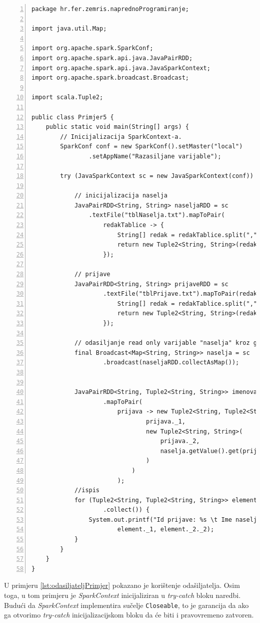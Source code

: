 \documentclass[times, utf8, zavrsni, numeric]{fer}
\begin{document}
\vspace{5mm}
\begin{lstlisting}[numbers=left, label={lst:odasiljateljPrimjer}, caption={Korištenje odašiljatelja.}, escapechar=|]
package hr.fer.zemris.naprednoProgramiranje;

import java.util.Map;

import org.apache.spark.SparkConf;
import org.apache.spark.api.java.JavaPairRDD;
import org.apache.spark.api.java.JavaSparkContext;
import org.apache.spark.broadcast.Broadcast;

import scala.Tuple2;

public class Primjer5 {
	public static void main(String[] args) {
		// Inicijalizacija SparkContext-a.
		SparkConf conf = new SparkConf().setMaster("local")
				.setAppName("Razasiljane varijable");
				
		try (JavaSparkContext sc = new JavaSparkContext(conf)) {
		
			// inicijalizacija naselja
			JavaPairRDD<String, String> naseljaRDD = sc
				.textFile("tblNaselja.txt").mapToPair(
					redakTablice -> {
						String[] redak = redakTablice.split(",");
						return new Tuple2<String, String>(redak[0], redak[1]);
					});
					
			// prijave
			JavaPairRDD<String, String> prijaveRDD = sc
					.textFile("tblPrijave.txt").mapToPair(redakTablice -> {
						String[] redak = redakTablice.split(",");
						return new Tuple2<String, String>(redak[0], redak[1]);
					});
							
			// odasiljanje read only varijable "naselja" kroz grozd
			final Broadcast<Map<String, String>> naselja = sc
					.broadcast(naseljaRDD.collectAsMap());

			
			JavaPairRDD<String, Tuple2<String, String>> imenovanePrijave = prijaveRDD
					.mapToPair(
						prijava -> new Tuple2<String, Tuple2<String, String>>(
								prijava._1,
								new Tuple2<String, String>(
									prijava._2,
									naselja.getValue().get(prijava._2)
								)
							)
						);
			//ispis
			for (Tuple2<String, Tuple2<String, String>> element : imenovanePrijave
					.collect()) {
				System.out.printf("Id prijave: %s \t Ime naselja: %s\n",
						element._1, element._2._2);
			}
		}
	}
}
\end{lstlisting}
\vspace{5mm}

U primjeru \ref{lst:odasiljateljPrimjer} pokazano je korištenje odašiljatelja. Osim toga, u tom primjeru je \emph{SparkContext} inicijaliziran u \emph{try-catch} bloku naredbi. Budući da \emph{SparkContext} implementira sučelje \texttt{Closeable}, to je garancija da ako ga otvorimo \emph{try-catch} inicijalizacijskom bloku da će biti i pravovremeno zatvoren.
\end{document}
